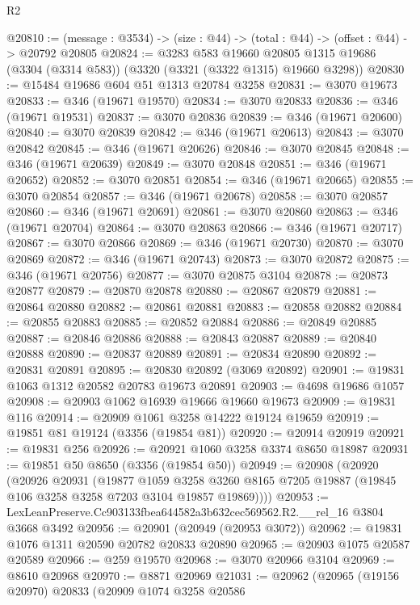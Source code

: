 \begin{lexlean}{R2}
\begin{coremodule}
@20810 := (message : @3534) -> (size : @44) -> (total : @44) -> (offset : @44) -> @20792 @20805
@20824 := @3283
    @583
    @19660
    @20805
    @1315
    @19686
    (@3304 (@3314 @583))
    (@3320 (@3321 (@3322 @1315) @19660 @3298))
@20830 := @15484 @19686 @604 @51 @1313 @20784 @3258
@20831 := @3070 @19673
@20833 := @346 (@19671 @19570)
@20834 := @3070 @20833
@20836 := @346 (@19671 @19531)
@20837 := @3070 @20836
@20839 := @346 (@19671 @20600)
@20840 := @3070 @20839
@20842 := @346 (@19671 @20613)
@20843 := @3070 @20842
@20845 := @346 (@19671 @20626)
@20846 := @3070 @20845
@20848 := @346 (@19671 @20639)
@20849 := @3070 @20848
@20851 := @346 (@19671 @20652)
@20852 := @3070 @20851
@20854 := @346 (@19671 @20665)
@20855 := @3070 @20854
@20857 := @346 (@19671 @20678)
@20858 := @3070 @20857
@20860 := @346 (@19671 @20691)
@20861 := @3070 @20860
@20863 := @346 (@19671 @20704)
@20864 := @3070 @20863
@20866 := @346 (@19671 @20717)
@20867 := @3070 @20866
@20869 := @346 (@19671 @20730)
@20870 := @3070 @20869
@20872 := @346 (@19671 @20743)
@20873 := @3070 @20872
@20875 := @346 (@19671 @20756)
@20877 := @3070 @20875 @3104
@20878 := @20873 @20877
@20879 := @20870 @20878
@20880 := @20867 @20879
@20881 := @20864 @20880
@20882 := @20861 @20881
@20883 := @20858 @20882
@20884 := @20855 @20883
@20885 := @20852 @20884
@20886 := @20849 @20885
@20887 := @20846 @20886
@20888 := @20843 @20887
@20889 := @20840 @20888
@20890 := @20837 @20889
@20891 := @20834 @20890
@20892 := @20831 @20891
@20895 := @20830 @20892 (@3069 @20892)
@20901 := @19831 @1063 @1312 @20582 @20783 @19673 @20891
@20903 := @4698 @19686 @1057
@20908 := @20903 @1062 @16939 @19666 @19660 @19673
@20909 := @19831 @116
@20914 := @20909 @1061 @3258 @14222 @19124 @19659
@20919 := @19851 @81 @19124 (@3356 (@19854 @81))
@20920 := @20914 @20919
@20921 := @19831 @256
@20926 := @20921 @1060 @3258 @3374 @8650 @18987
@20931 := @19851 @50 @8650 (@3356 (@19854 @50))
@20949 := @20908
    (@20920
      (@20926
        @20931
        (@19877
          @1059
          @3258
          @3260
          @8165
          @7205
          @19887
          (@19845 @106 @3258 @3258 @7203 @3104 @19857 @19869))))
@20953 := LexLeanPreserve.Cc903133fbea644582a3b632cec569562.R2.__rel_16 @3804 @3668 @3492
@20956 := @20901 (@20949 (@20953 @3072))
@20962 := @19831 @1076 @1311 @20590 @20782 @20833 @20890
@20965 := @20903 @1075 @20587 @20589
@20966 := @259 @19570
@20968 := @3070 @20966 @3104
@20969 := @8610 @20968
@20970 := @8871 @20969
@21031 := @20962
    (@20965
      (@19156 @20970)
      @20833
      (@20909
        @1074
        @3258
        @20586

\end{coremodule}
\end{lexlean}
